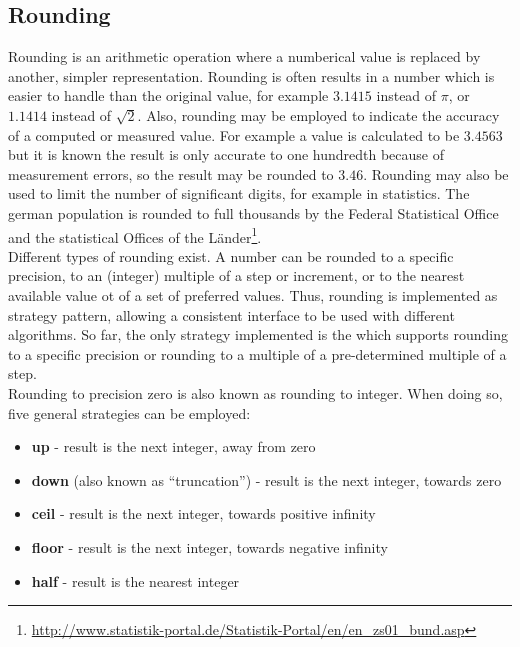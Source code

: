 
\subsection{Rounding}
Rounding is an arithmetic operation where a numberical value is replaced by another, simpler representation.
Rounding is often results in a number which is easier to handle than the original value, for example $3.1415$ instead of $\pi$, or $1.1414$ instead of $\sqrt{2}$.
Also, rounding may be employed to indicate the accuracy of a computed or measured value. 
For example a value is calculated to be $3.4563$ but it is known the result is only accurate to one hundredth because of measurement errors, so the result may be rounded to $3.46$. 
Rounding may also be used to limit the number of significant digits, for example in statistics.
The german population is rounded to full thousands by the Federal Statistical Office and the statistical Offices of the L\"ander\footnote{\url{http://www.statistik-portal.de/Statistik-Portal/en/en_zs01_bund.asp}}.
\\

Different types of rounding exist. A number can be rounded to a specific precision, to an (integer) multiple of a step or increment, or to the nearest available value ot of a set of preferred values.
Thus, rounding is implemented as strategy pattern, allowing a consistent interface to be used with different algorithms.
So far, the only strategy implemented is the  which supports rounding to a specific precision or rounding to a multiple of a pre-determined multiple of a step.
\\

Rounding to precision zero is also known as rounding to integer.
When doing so, five general strategies can be employed:

\begin{itemize}
\item{\textbf{up} - result is the next integer, away from zero}
\item{\textbf{down} (also known as ``truncation'') - result is the next integer, towards zero}
\item{\textbf{ceil} - result is the next integer, towards positive infinity}
\item{\textbf{floor} - result is the next integer, towards negative infinity}
\item{\textbf{half} - result is the nearest integer}
\end{itemize}

